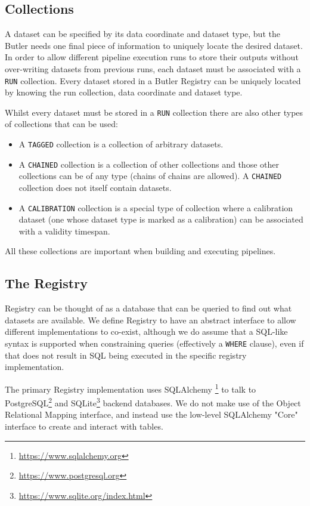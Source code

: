 \documentclass[]{spie}
\begin{document}
\subsection{Collections}

A dataset can be specified by its data coordinate and dataset type, but the Butler needs one final piece of information to uniquely locate the desired dataset.
In order to allow different pipeline execution runs to store their outputs without over-writing datasets from previous runs, each dataset must be associated with a \texttt{RUN} collection.
Every dataset stored in a Butler Registry can be uniquely located by knowing the run collection, data coordinate and dataset type.

Whilst every dataset must be stored in a \texttt{RUN} collection there are also other types of collections that can be used:

\begin{itemize}
\item A \texttt{TAGGED} collection is a collection of arbitrary datasets.
\item A \texttt{CHAINED} collection is a collection of other collections and those other collections can be of any type (chains of chains are allowed).
      A \texttt{CHAINED} collection does not itself contain datasets.
\item A \texttt{CALIBRATION} collection is a special type of collection where a calibration dataset (one whose dataset type is marked as a calibration) can be associated with a validity timespan.
\end{itemize}

All these collections are important when building and executing pipelines.

\subsection{The Registry}

Registry can be thought of as a database that can be queried to find out what datasets are available.
We define Registry to have an abstract interface to allow different implementations to co-exist, although we do assume that a SQL-like syntax is supported when constraining queries (effectively a \texttt{WHERE} clause), even if that does not result in SQL being executed in the specific registry implementation.

The primary Registry implementation uses SQLAlchemy \cite{myers2015essential}\footnote{\url{https://www.sqlalchemy.org}} to talk to PostgreSQL\footnote{\url{https://www.postgresql.org}} and SQLite\footnote{\url{https://www.sqlite.org/index.html}} backend databases.
We do not make use of the Object Relational Mapping interface, and instead use the low-level SQLAlchemy "Core" interface to create and interact with tables.
\end{document}
